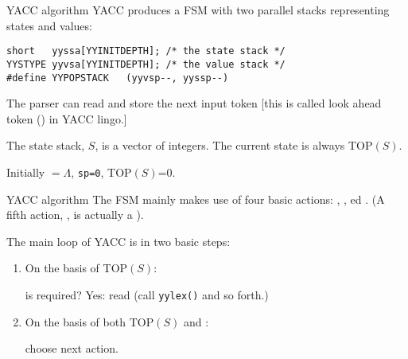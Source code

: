 \begin{frame}[fragile]{YACC algorithm}
YACC produces a FSM with two parallel stacks representing
states and values:

\vspace{20pt}


\begin{verbatim}
short	yyssa[YYINITDEPTH]; /* the state stack */
YYSTYPE yyvsa[YYINITDEPTH]; /* the value stack */
#define YYPOPSTACK   (yyvsp--, yyssp--)
\end{verbatim}


\vspace{20pt}

The parser can read and store the next input token
[this is called
look ahead token (\lat) in YACC lingo.]


\vspace{20pt}

The state stack,
$S$, is a vector of integers. The current state is always
TOP$(S)$.


\vspace{20pt}

Initially \lat $=\Lambda$, {\tt sp=0}, TOP$(S)$=0.
\end{frame}

\begin{frame}[fragile]{YACC algorithm}
The FSM mainly makes use of four basic actions:
\shift, \reduce, \accept{} ed \error.
(A fifth action, \goto, is actually a \shift).


\vspace{20pt}

The main loop of YACC is in two basic steps:


\vspace{20pt}

\begin{enumerate}
\item On the basis of TOP$(S)$:

      is  \lat{} required? Yes: read \lat{} (call {\tt yylex()} and so forth.)
\item On the basis of both TOP$(S)$ and \lat:

      choose next action.
\end{enumerate}
\end{frame}

